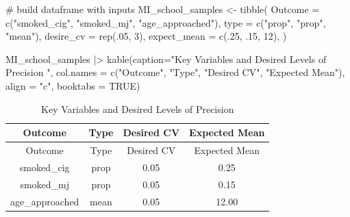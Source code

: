 \documentclass[
  12pt]{article}
\newenvironment{Shaded}{\begin{snugshade}}{\end{snugshade}}
\newcommand{\AttributeTok}[1]{\textcolor[rgb]{0.40,0.45,0.13}{#1}}
\newcommand{\CommentTok}[1]{\textcolor[rgb]{0.37,0.37,0.37}{#1}}
\newcommand{\ConstantTok}[1]{\textcolor[rgb]{0.56,0.35,0.01}{#1}}
\newcommand{\DecValTok}[1]{\textcolor[rgb]{0.68,0.00,0.00}{#1}}
\newcommand{\FunctionTok}[1]{\textcolor[rgb]{0.28,0.35,0.67}{#1}}
\newcommand{\NormalTok}[1]{\textcolor[rgb]{0.00,0.23,0.31}{#1}}
\newcommand{\OtherTok}[1]{\textcolor[rgb]{0.00,0.23,0.31}{#1}}
\newcommand{\SpecialCharTok}[1]{\textcolor[rgb]{0.37,0.37,0.37}{#1}}
\newcommand{\StringTok}[1]{\textcolor[rgb]{0.13,0.47,0.30}{#1}}
\begin{document}
\begin{Shaded}
\begin{Highlighting}[]
\CommentTok{\# build dataframe with inputs}
\NormalTok{MI\_school\_samples }\OtherTok{\textless{}{-}} \FunctionTok{tibble}\NormalTok{(}
  \AttributeTok{Outcome =} \FunctionTok{c}\NormalTok{(}\StringTok{"smoked\_cig"}\NormalTok{, }\StringTok{"smoked\_mj"}\NormalTok{, }\StringTok{"age\_approached"}\NormalTok{),}
  \AttributeTok{type =} \FunctionTok{c}\NormalTok{(}\StringTok{"prop"}\NormalTok{, }\StringTok{"prop"}\NormalTok{, }\StringTok{"mean"}\NormalTok{),}
  \AttributeTok{desire\_cv =} \FunctionTok{rep}\NormalTok{(.}\DecValTok{05}\NormalTok{, }\DecValTok{3}\NormalTok{),}
  \AttributeTok{expect\_mean =} \FunctionTok{c}\NormalTok{(.}\DecValTok{25}\NormalTok{, .}\DecValTok{15}\NormalTok{, }\DecValTok{12}\NormalTok{),}
\NormalTok{) }

\NormalTok{MI\_school\_samples }\SpecialCharTok{|\textgreater{}} 
  \FunctionTok{kable}\NormalTok{(}\AttributeTok{caption=}\StringTok{"Key Variables and Desired Levels of Precision "}\NormalTok{,}
        \AttributeTok{col.names =} \FunctionTok{c}\NormalTok{(}\StringTok{"Outcome"}\NormalTok{, }\StringTok{"Type"}\NormalTok{, }\StringTok{"Desired CV"}\NormalTok{, }\StringTok{"Expected Mean"}\NormalTok{),  }
        \AttributeTok{align =} \StringTok{"c"}\NormalTok{, }\AttributeTok{booktabs =} \ConstantTok{TRUE}\NormalTok{) }
\end{Highlighting}
\end{Shaded}

\begin{longtable}[]{@{}cccc@{}}
\caption{Key Variables and Desired Levels of Precision}\tabularnewline
\toprule\noalign{}
Outcome & Type & Desired CV & Expected Mean \\
\midrule\noalign{}
\endfirsthead
\toprule\noalign{}
Outcome & Type & Desired CV & Expected Mean \\
\midrule\noalign{}
\endhead
\bottomrule\noalign{}
\endlastfoot
smoked\_cig & prop & 0.05 & 0.25 \\
smoked\_mj & prop & 0.05 & 0.15 \\
age\_approached & mean & 0.05 & 12.00 \\
\end{longtable}
\end{document}
